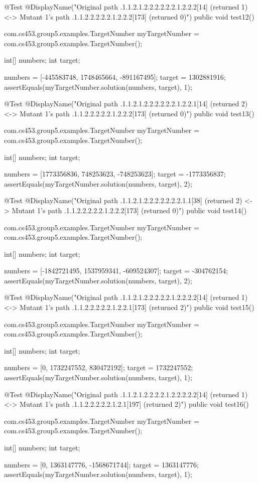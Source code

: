 @Test
@DisplayName("Original path .1.1.2.1.2.2.2.2.2.2.1.2.2.2[14] (returned 1) <-> Mutant 1's path .1.1.2.2.2.2.2.1.2.2.2[173] (returned 0)")
public void test12() {
    com.cs453.group5.examples.TargetNumber myTargetNumber = com.cs453.group5.examples.TargetNumber();

    int[] numbers;
    int target;

    numbers = [-445583748, 1748465664, -891167495];
    target = 1302881916;
    assertEquals(myTargetNumber.solution(numbers, target), 1);
}

@Test
@DisplayName("Original path .1.1.2.1.2.2.2.2.2.2.1.2.2.1[14] (returned 2) <-> Mutant 1's path .1.1.2.2.2.2.2.1.2.2.2[173] (returned 0)")
public void test13() {
    com.cs453.group5.examples.TargetNumber myTargetNumber = com.cs453.group5.examples.TargetNumber();

    int[] numbers;
    int target;

    numbers = [1773356836, 748253623, -748253623];
    target = -1773356837;
    assertEquals(myTargetNumber.solution(numbers, target), 2);
}

@Test
@DisplayName("Original path .1.1.2.1.2.2.2.2.2.2.2.1.1[38] (returned 2) <-> Mutant 1's path .1.1.2.2.2.2.2.1.2.2.2[173] (returned 0)")
public void test14() {
    com.cs453.group5.examples.TargetNumber myTargetNumber = com.cs453.group5.examples.TargetNumber();

    int[] numbers;
    int target;

    numbers = [-1842721495, 1537959341, -609524307];
    target = -304762154;
    assertEquals(myTargetNumber.solution(numbers, target), 2);
}

@Test
@DisplayName("Original path .1.1.2.1.2.2.2.2.2.1.2.2.2.2[14] (returned 1) <-> Mutant 1's path .1.1.2.2.2.2.2.1.2.2.1[173] (returned 2)")
public void test15() {
    com.cs453.group5.examples.TargetNumber myTargetNumber = com.cs453.group5.examples.TargetNumber();

    int[] numbers;
    int target;

    numbers = [0, 1732247552, 830472192];
    target = 1732247552;
    assertEquals(myTargetNumber.solution(numbers, target), 1);
}

@Test
@DisplayName("Original path .1.1.2.1.2.2.2.2.1.2.2.2.2.2[14] (returned 1) <-> Mutant 1's path .1.1.2.2.2.2.2.1.2.1[197] (returned 2)")
public void test16() {
    com.cs453.group5.examples.TargetNumber myTargetNumber = com.cs453.group5.examples.TargetNumber();

    int[] numbers;
    int target;

    numbers = [0, 1363147776, -1568671744];
    target = 1363147776;
    assertEquals(myTargetNumber.solution(numbers, target), 1);
}

